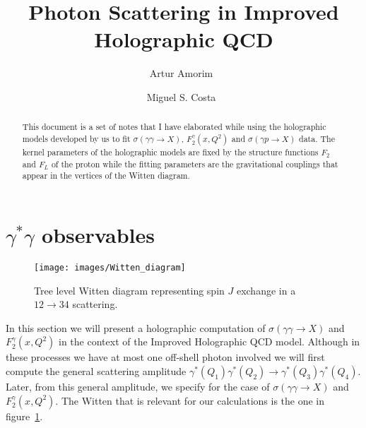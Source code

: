 \documentclass[preprint, 12pt]{elsarticle}
\begin{document}
\begin{frontmatter}

\title{Photon Scattering in Improved Holographic QCD}

\author[ath]{Artur Amorim~}
\author[ath]{Miguel S. Costa~}
\address[ath]{Centro de F\'{\i}sica do Porto e Departamento de F\'{\i}sica e Astronomia da Faculdade de Ci\^encias da Universidade do Porto, Rua do Campo Alegre 687, 4169-007 Porto, Portugal}


\begin{abstract}

This document is a set of notes that I have elaborated while using the holographic models developed by us to fit $\sigma\left(\gamma \gamma \rightarrow X\right)$, $F_2^\gamma\left(x, Q^2\right)$ and $\sigma\left(\gamma p \rightarrow X\right)$ data. The kernel parameters of the holographic models are fixed by the structure functions $F_2$ and $F_L$ of the proton while the fitting parameters are the gravitational couplings that appear in the vertices of the Witten diagram.

\end{abstract}

\end{frontmatter}

\section{$\gamma^{*}\gamma$ observables}
\begin{figure}[!h]
  \center
  \texttt{[image: images/Witten\_diagram]} 
  \caption{Tree level Witten diagram representing spin $J$    exchange in a $12\to34$ scattering. 
}
  \label{fig:Witten_diagram}
\end{figure}
In this section we will present a holographic computation of  $\sigma\left(\gamma \gamma \rightarrow X\right)$ and $F_2^\gamma\left(x, Q^2\right)$ in the context of the Improved Holographic QCD model. Although in these processes we have at most one off-shell photon involved we will first compute the general scattering amplitude $\gamma^{*}\left(Q_1\right)\gamma^{*}\left(Q_2\right) \rightarrow \gamma^{*}\left(Q_3\right) \gamma^{*}\left(Q_4\right)$. Later, from this general amplitude, we specify for the case of $\sigma\left(\gamma \gamma \rightarrow X\right)$ and $F_2^\gamma\left(x, Q^2\right)$. The Witten that is relevant for our calculations is the one in figure~\ref{fig:Witten_diagram}.
\end{document}
